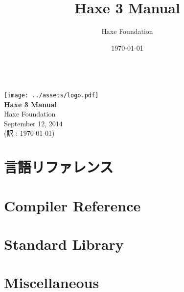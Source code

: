\documentclass{../haxe}
\renewcommand{\maketitle}{
   \begin{titlepage}
     \setcounter{page}{-1}
			\begin{center}
				~\\[3cm]
				\texttt{[image: ../assets/logo.pdf]}~\\[1cm]
				{\huge \bfseries Haxe 3 Manual}\\[7cm]
				Haxe Foundation\\
				September 12, 2014\\
				(訳 : \today)
			\end{center}
   \end{titlepage}
}
\begin{document}
\title{Haxe 3 Manual}
\author{Haxe Foundation}
\date{\today}
\maketitle


\clearpage
\todototoc
\listoftodos
\clearpage

\clearpage
\tableofcontents
\clearpage



\part{言語リファレンス}






\part{Compiler Reference}




\part{Standard Library}


\part{Miscellaneous}


\end{document}

